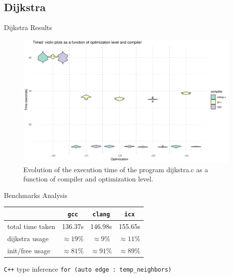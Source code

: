 \documentclass{beamer}
\newcommand{\gcc}{\texttt{gcc} }
\newcommand{\icx}{\texttt{icx} }
\newcommand{\clang}{\texttt{clang} }
\newcommand{\cpp}{\texttt{C++} }
\begin{document}
    \subsection{Dijkstra}
    \begin{frame}{Dijkstra Results}
        \begin{figure}[H]
        \centering
        \includegraphics[width=1\textwidth]{img/plots/violin_plot_dijkstra.png}
        \caption{Evolution of the execution time of the program dijkstra.c as a function of compiler and optimization level.}
        \label{fig:image2}
        \end{figure}
    \end{frame}
    
    \begin{frame}[<+->]{Benchmarks Analysis}
        \begin{block}{}
            \begin{table}[H]
            \centering
            \begin{tabular}{|l|c|c|c|}
            \hline
            & \gcc & \clang & \icx \\
            \hline
            total time taken & 136.37s       & 146.98s       & 155.65s \\
            dijkstra usage   & $\approx19\%$ & $\approx9\%$  & $\approx11\%$    \\
            init/free usage  & $\approx81\%$ & $\approx91\%$ & $\approx89\%$   \\
            \hline
            \end{tabular}
            \end{table}
        \end{block}
        \begin{block}{\cpp type inference}
            \texttt{for (auto edge : temp\_neighbors)}
        \end{block}
    \end{frame}
    
\end{document}

